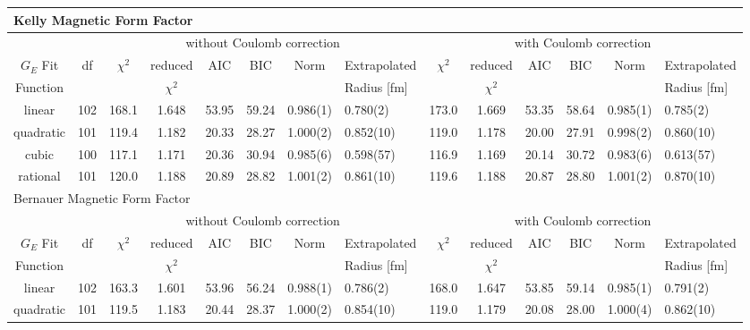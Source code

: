 \documentclass[10pt,aps,prc,twocolumn]{revtex4-1}
\begin{document}
\begin{table}
\begin{tabular}{cc|cccccl|cccccl}
\multicolumn{14}{l}{Kelly Magnetic Form Factor}                                   \\ \hline
          &     & \multicolumn{6}{c}{without Coulomb correction}                 & \multicolumn{6}{|c}{with Coulomb correction} \\
$G_E$ Fit & df  & $\chi^2$ & reduced   & AIC    & BIC    & Norm      & Extrapolated    & $\chi^2$ & reduced   & AIC    & BIC    & Norm      & Extrapolated     \\  
Function  &     &          & $\chi^2$  &        &        &           & Radius [fm]      &          & $\chi^2$  &        &        &           & Radius [fm]            \\ \hline
linear    & 102 & 168.1    & 1.648     & 53.95  & 59.24  & 0.986(1)  & 0.780(2)  & 173.0    & 1.669     & 53.35  & 58.64  & 0.985(1)  & 0.785(2)    \\
quadratic & 101 & 119.4    & 1.182     & 20.33  & 28.27  & 1.000(2)  & 0.852(10) & 119.0    & 1.178     & 20.00  & 27.91  & 0.998(2)  & 0.860(10)   \\
cubic     & 100 & 117.1    & 1.171     & 20.36  & 30.94  & 0.985(6)  & 0.598(57) & 116.9    & 1.169     & 20.14  & 30.72  & 0.983(6)  & 0.613(57)   \\    
rational  & 101 & 120.0    & 1.188     & 20.89  & 28.82  & 1.001(2)  & 0.861(10) & 119.6    & 1.188     & 20.87  & 28.80  & 1.001(2)  & 0.870(10)   \\ \hline \hline
\multicolumn{14}{l}{Bernauer Magnetic Form Factor}                                 \\ \hline
          &     & \multicolumn{6}{c}{without Coulomb correction}                 & \multicolumn{6}{|c}{with Coulomb correction} \\
$G_E$ Fit & df  & $\chi^2$ & reduced   & AIC    & BIC    & Norm      & Extrapolated    & $\chi^2$ & reduced   & AIC    & BIC    & Norm      & Extrapolated      \\  
Function  &     &          &$\chi^2$  &        &       &             & Radius [fm]      &          & $\chi^2$  &        &        &           & Radius [fm]            \\ \hline
linear    & 102 & 163.3    & 1.601     & 53.96  & 56.24 & 0.988(1)   & 0.786(2)  & 168.0    & 1.647     & 53.85  & 59.14  & 0.985(1)  & 0.791(2)    \\
quadratic & 101 & 119.5    & 1.183     & 20.44  & 28.37 & 1.000(2)   & 0.854(10) & 119.0    & 1.179     & 20.08  & 28.00  & 1.000(4)  & 0.862(10)    \\ 

\end{tabular}
\end{table}
\end{document}
